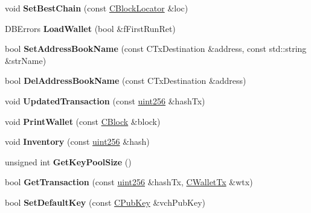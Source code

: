 \begin{DoxyCompactItemize}
void {\bfseries Set\+Best\+Chain} (const \mbox{\hyperlink{class_c_block_locator}{C\+Block\+Locator}} \&loc)
\item 
\mbox{\label{class_c_wallet_a5d7b244b8ed0cbe24233ee0b6ca3cae0}} 
D\+B\+Errors {\bfseries Load\+Wallet} (bool \&f\+First\+Run\+Ret)
\item 
\mbox{\label{class_c_wallet_a95d2dd3693db562aa11afbecf33e1276}} 
bool {\bfseries Set\+Address\+Book\+Name} (const C\+Tx\+Destination \&address, const std\+::string \&str\+Name)
\item 
\mbox{\label{class_c_wallet_ac21ad6cf1271b08f0392259643ef5804}} 
bool {\bfseries Del\+Address\+Book\+Name} (const C\+Tx\+Destination \&address)
\item 
\mbox{\label{class_c_wallet_aa1807c9ad3430a7c22c7eb0868c49403}} 
void {\bfseries Updated\+Transaction} (const \mbox{\hyperlink{classuint256}{uint256}} \&hash\+Tx)
\item 
\mbox{\label{class_c_wallet_aa9e0d90b21e0bd041757589603d27e0a}} 
void {\bfseries Print\+Wallet} (const \mbox{\hyperlink{class_c_block}{C\+Block}} \&block)
\item 
\mbox{\label{class_c_wallet_a1d8866fc8756a846058ea16c730b02e1}} 
void {\bfseries Inventory} (const \mbox{\hyperlink{classuint256}{uint256}} \&hash)
\item 
\mbox{\label{class_c_wallet_a9d7415d88d10655ff2188bc713dff662}} 
unsigned int {\bfseries Get\+Key\+Pool\+Size} ()
\item 
\mbox{\label{class_c_wallet_af11074b729403d68ee9e56f1a4654796}} 
bool {\bfseries Get\+Transaction} (const \mbox{\hyperlink{classuint256}{uint256}} \&hash\+Tx, \mbox{\hyperlink{class_c_wallet_tx}{C\+Wallet\+Tx}} \&wtx)
\item 
\mbox{\label{class_c_wallet_ad54cca8f6e5e1d5535860f43ddb0246f}} 
bool {\bfseries Set\+Default\+Key} (const \mbox{\hyperlink{class_c_pub_key}{C\+Pub\+Key}} \&vch\+Pub\+Key)
\item 
\mbox{\label{class_c_wallet_afa48a3ee3096681650c8b9589579e9cb}} 

\end{DoxyCompactItemize}
